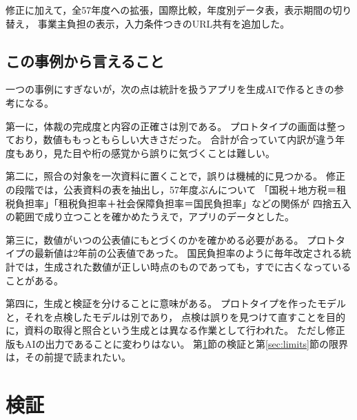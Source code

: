 \documentclass[paper=a4,fontsize=10pt]{jlreq}
\begin{document}
\medskip
修正に加えて，全57年度への拡張，国際比較，年度別データ表，表示期間の切り替え，
事業主負担の表示，入力条件つきのURL共有を追加した。

\subsection{この事例から言えること}

一つの事例にすぎないが，次の点は統計を扱うアプリを生成AIで作るときの参考になる。

第一に，体裁の完成度と内容の正確さは別である。
プロトタイプの画面は整っており，数値ももっともらしい大きさだった。
合計が合っていて内訳が違う年度もあり，見た目や桁の感覚から誤りに気づくことは難しい。

第二に，照合の対象を一次資料に置くことで，誤りは機械的に見つかる。
修正の段階では，公表資料の表を抽出し，57年度ぶんについて
「国税＋地方税＝租税負担率」「租税負担率＋社会保障負担率＝国民負担率」などの関係が
四捨五入の範囲で成り立つことを確かめたうえで，アプリのデータとした。

第三に，数値がいつの公表値にもとづくのかを確かめる必要がある。
プロトタイプの最新値は2年前の公表値であった。
国民負担率のように毎年改定される統計では，生成された数値が正しい時点のものであっても，すでに古くなっていることがある。

第四に，生成と検証を分けることに意味がある。
プロトタイプを作ったモデルと，それを点検したモデルは別であり，
点検は誤りを見つけて直すことを目的に，資料の取得と照合という生成とは異なる作業として行われた。
ただし修正版もAIの出力であることに変わりはない。
第\ref{sec:verify}節の検証と第\ref{sec:limits}節の限界は，その前提で読まれたい。

\section{検証}\label{sec:verify}
\end{document}
